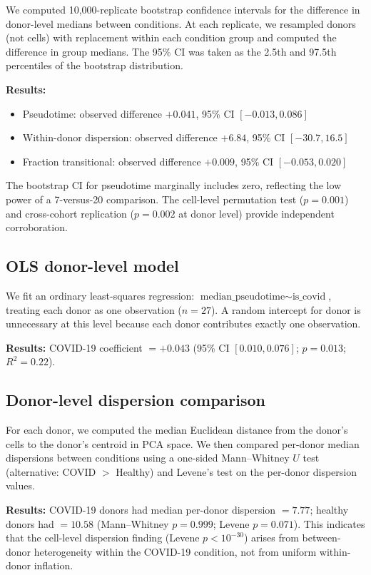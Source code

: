 \documentclass[11pt]{article}
\begin{document}
We computed 10,000-replicate bootstrap confidence intervals for the difference in donor-level medians between conditions. At each replicate, we resampled donors (not cells) with replacement within each condition group and computed the difference in group medians. The 95\% CI was taken as the 2.5th and 97.5th percentiles of the bootstrap distribution.

\textbf{Results:}
\begin{itemize}
    \item Pseudotime: observed difference $+0.041$, 95\% CI $[-0.013, 0.086]$
    \item Within-donor dispersion: observed difference $+6.84$, 95\% CI $[-30.7, 16.5]$
    \item Fraction transitional: observed difference $+0.009$, 95\% CI $[-0.053, 0.020]$
\end{itemize}

The bootstrap CI for pseudotime marginally includes zero, reflecting the low power of a 7-versus-20 comparison. The cell-level permutation test ($p = 0.001$) and cross-cohort replication ($p = 0.002$ at donor level) provide independent corroboration.

\subsection{OLS donor-level model}

We fit an ordinary least-squares regression: $\text{median\_pseudotime} \sim \text{is\_covid}$, treating each donor as one observation ($n = 27$). A random intercept for donor is unnecessary at this level because each donor contributes exactly one observation.

\textbf{Results:} COVID-19 coefficient $= +0.043$ (95\% CI $[0.010, 0.076]$; $p = 0.013$; $R^2 = 0.22$).

\subsection{Donor-level dispersion comparison}

For each donor, we computed the median Euclidean distance from the donor's cells to the donor's centroid in PCA space. We then compared per-donor median dispersions between conditions using a one-sided Mann--Whitney $U$ test (alternative: COVID $>$ Healthy) and Levene's test on the per-donor dispersion values.

\textbf{Results:} COVID-19 donors had median per-donor dispersion $= 7.77$; healthy donors had $= 10.58$ (Mann--Whitney $p = 0.999$; Levene $p = 0.071$). This indicates that the cell-level dispersion finding (Levene $p < 10^{-30}$) arises from between-donor heterogeneity within the COVID-19 condition, not from uniform within-donor inflation.
\end{document}

